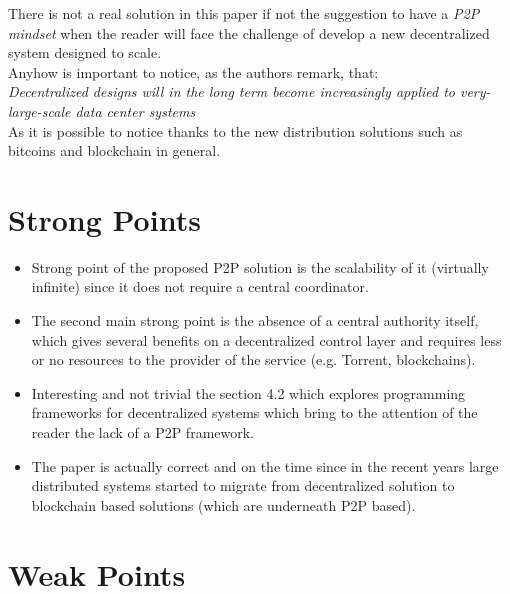 \documentclass[paper=a4, fontsize=11pt]{scrartcl} %
\numberwithin{equation}{section} %
\numberwithin{figure}{section} %
\numberwithin{table}{section} %
\begin{document}
There is not a real solution in this paper if not the suggestion to have a \textit{P2P mindset} when the reader will face the challenge of develop a new decentralized system designed to scale. \\
Anyhow is important to notice, as the authors remark, that:\\
\textit{Decentralized designs will in the long term become increasingly applied to very-large-scale data center systems} \\
As it is possible to notice thanks to the new distribution solutions such as bitcoins and blockchain in general.


\section{Strong Points}

\begin{itemize} 
  \item Strong point of the proposed P2P solution is the scalability of it (virtually infinite) since it does not require a central coordinator.
  
  \item The second main strong point is the absence of a central authority itself, which gives several benefits on a decentralized control layer and requires less or no resources to the provider of the service (e.g. Torrent, blockchains).

  \item Interesting and not trivial the section 4.2 which explores programming frameworks for decentralized systems which bring to the attention of the reader the lack of a P2P framework.

  \item The paper is actually correct and on the time since in the recent years large distributed systems started to migrate from decentralized solution to blockchain based solutions (which are underneath P2P based).
\end{itemize}

\section{Weak Points}
\end{document}

